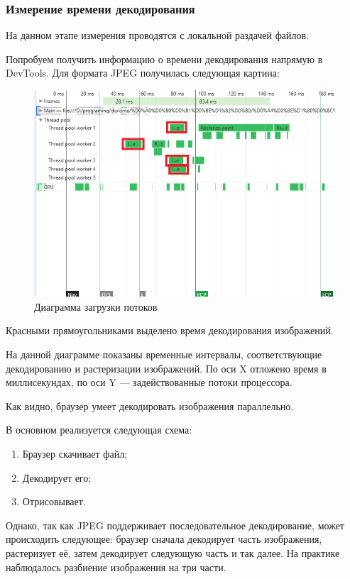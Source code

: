 \documentclass[12pt]{article}
\begin{document}
\subsubsection{Измерение времени декодирования}

На данном этапе измерения проводятся с локальной раздачей файлов.

Попробуем получить информацию о времени декодирования напрямую
в DevTools. Для формата JPEG получилась следующая картина:

\begin{figure}[H]
    \centering
    \includegraphics[width=1\textwidth]{../images/image_comp/devtools.png}
    \caption{Диаграмма загрузки потоков}
\end{figure}

Красными прямоугольниками выделено время декодирования изображений.

На данной диаграмме показаны временные интервалы, соответствующие декодированию и растеризации изображений.
По оси X отложено время в миллисекундах, по оси Y — задействованные потоки процессора.

Как видно, браузер умеет декодировать изображения параллельно.

В основном реализуется следующая схема:

\begin{enumerate}
    \item Браузер скачивает файл;
    \item Декодирует его;
    \item Отрисовывает.
\end{enumerate}

Однако, так как JPEG поддерживает последовательное декодирование,
может происходить следующее: браузер сначала декодирует часть изображения,
растеризует её, затем декодирует следующую часть и так далее.
На практике наблюдалось разбиение изображения на три части.
\end{document}
